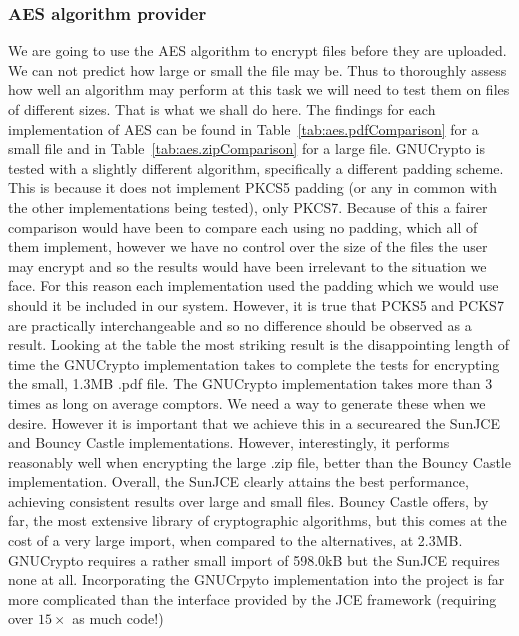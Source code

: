 \documentclass[12pt, titlepage]{article}
\begin{document}
\subsubsection{AES algorithm provider}
We are going to use the AES algorithm to encrypt files before they are uploaded. We can not predict how large or small the file may be. Thus to thoroughly assess how well an algorithm may perform at this task we will need to test them on files of different sizes. That is what we shall do here.
\newline \indent The findings for each implementation of AES can be found in Table~\ref{tab:aes.pdfComparison} for a small file and in Table~\ref{tab:aes.zipComparison} for a large file.
\newline \indent GNUCrypto is tested with a slightly different algorithm, specifically a different padding scheme. This is because it does not implement PKCS5 padding (or any in common with the other implementations being tested), only PKCS7. Because of this a fairer comparison would have been to compare each using no padding, which all of them implement, however we have no control over the size of the files the user may encrypt and so the results would have been irrelevant to the situation we face. For this reason each implementation used the padding which we would use should it be included in our system. However, it is true that PCKS5 and PCKS7 are practically interchangeable and so no difference should be observed as a result.
\newline \indent Looking at the table the most striking result is the disappointing length of time the GNUCrypto implementation takes to complete the tests for encrypting the small, 1.3MB .pdf file. The GNUCrypto implementation takes more than 3 times as long on average comptors. We need a way to generate these when we desire. However it is important that we achieve this in a secureared the SunJCE and Bouncy Castle implementations. However, interestingly, it performs reasonably well when encrypting the large .zip file, better than the Bouncy Castle implementation. Overall, the SunJCE clearly attains the best performance, achieving consistent results over large and small files.
\newline \indent Bouncy Castle offers, by far, the most extensive library of cryptographic algorithms, but this comes at the cost of a very large import, when compared to the alternatives, at 2.3MB. GNUCrypto requires a rather small import of 598.0kB but the SunJCE requires none at all.
\newline \indent Incorporating the GNUCrpyto implementation into the project is far more complicated than the interface provided by the JCE framework (requiring over $15\times$ as much code!)
\end{document}
